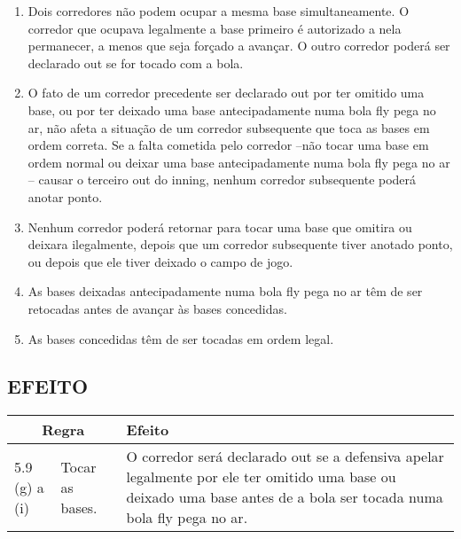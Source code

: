 \begin{multicols}{2}
\begin{enumerate}[label=\alph*)]
		\item Dois corredores n\~ao podem ocupar a mesma base simultaneamente. O corredor que ocupava legalmente a base primeiro \'e autorizado a nela permanecer, a menos que seja for\c{c}ado a avan\c{c}ar. O outro corredor poder\'a ser declarado \gls{out} se for tocado com a bola. 
		
		\item O fato de um corredor precedente ser declarado \gls{out} por ter omitido uma base, ou por ter deixado uma base antecipadamente numa bola \gls{fly} pega no ar, n\~ao afeta a situa\c{c}\~ao de um corredor subsequente que toca as bases em ordem correta. Se a falta cometida pelo corredor –n\~ao tocar uma base em ordem normal ou deixar uma base antecipadamente numa bola \gls{fly} pega no ar -- causar o terceiro \gls{out} do \gls{inning}, nenhum corredor subsequente poder\'a anotar ponto. 
		
		\item Nenhum corredor poder\'a retornar para tocar uma base que omitira ou deixara ilegalmente, depois que um corredor subsequente tiver anotado ponto, ou depois que ele tiver deixado o campo de jogo. 
		
		\item As bases deixadas antecipadamente numa bola \gls{fly} pega no ar t\^em de ser retocadas antes de avan\c{c}ar \`as bases concedidas. 
		
		\item As bases concedidas t\^em de ser tocadas em ordem legal. 
	\end{enumerate}
	
\end{multicols}

\subsection*{EFEITO} 	
\begin{tabular}{p{}p{}|p{}}
	\multicolumn{2}{c|}{Regra} & Efeito \\\hline\hline 
	5.9 (g) a (i) & Tocar as bases. & O corredor ser\'a declarado \gls{out} se a defensiva apelar legalmente por ele ter omitido uma base ou deixado uma base antes de a bola ser tocada numa bola \gls{fly} pega no ar. 
\end{tabular}



